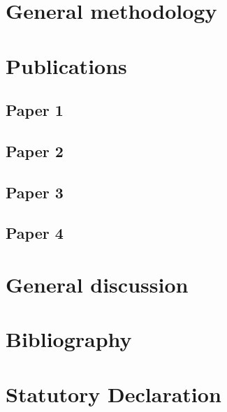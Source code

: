 \documentclass[11pt]{report}
\begin{document}
\chapter{General methodology}

\chapter{Publications}
\section{Paper 1}

\section{Paper 2}

\section{Paper 3}

\section{Paper 4}

\chapter{General discussion}

\chapter{Bibliography}



\chapter{Statutory Declaration}
\end{document}
